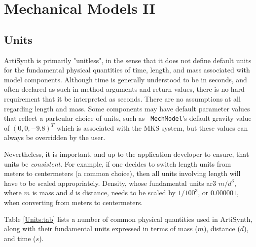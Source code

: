 \section{Mechanical Models II}
\label{MechModelsII:sec}

\subsection{Units}

ArtiSynth is primarily "unitless", in the sense that it does not
define default units for the fundamental physical quantities of time,
length, and mass associated with model components. Although time is
generally understood to be in seconds, and often declared as such in
method arguments and return values, there is no hard requirement that
it be interpreted as seconds. There are no assumptions at all
regarding length and mass. Some components may have default parameter
values that reflect a partcular choice of units, such as {\tt
MechModel}'s default gravity value of $(0, 0, -9.8)^T$ which is
associated with the MKS system, but these values can always be
overridden by the user.

Nevertheless, it is important, and up to the application developer to
ensure, that units be {\it consistent}. For example, if one decides to
switch length units from meters to centermeters (a common choice),
then all units involving length will have to be scaled appropriately.
Density, whose fundamental units ar3 $m/d^3$, where $m$ is mass and
$d$ is distance, needs to be scaled by $1/100^3$, or $0.000001$, when
converting from meters to centermeters.

Table \ref{Units:tab} lists a number of common physical quantities
used in ArtiSynth, along with their fundamental units expressed in
terms of mass ($m$), distance ($d$), and time ($s$).

